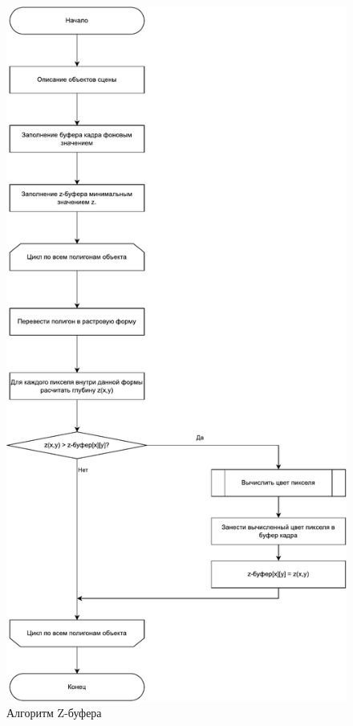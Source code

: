 \begin{figure}[H]
	\centering
	\includegraphics[height=1.5\textwidth]{images/z_buffer_morph.pdf}
	\caption{Алгоритм Z-буфера}
	\label{fig:z-buffer}
\end{figure}



